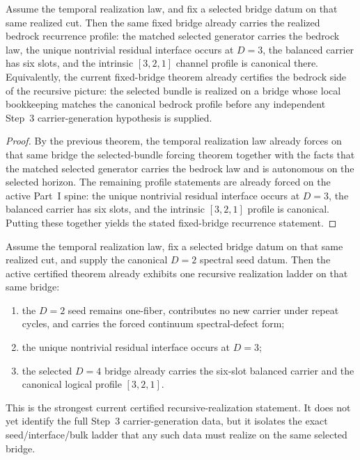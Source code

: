 \begin{theorem}
\label{thm:temporal-law-forces-the-realized-bedrock-recurrence-profile-on-a-fixed-bridge}
Assume the temporal realization law, and fix a selected bridge datum on that
same realized cut. Then the same fixed bridge already carries the realized
bedrock recurrence profile: the matched selected generator carries the bedrock
law, the unique nontrivial residual interface occurs at \(D=3\), the balanced
carrier has six slots, and the intrinsic \([3,2,1]\) channel profile is
canonical there. Equivalently, the current fixed-bridge theorem
already certifies the bedrock side of the recursive picture: the selected
bundle is realized on a bridge whose local bookkeeping matches the canonical
bedrock profile before any independent Step~3 carrier-generation hypothesis is
supplied.
\end{theorem}

\begin{proof}
By the previous theorem, the temporal realization law already forces on that
same bridge the selected-bundle forcing theorem together with the facts that
the matched selected generator carries the bedrock law and is autonomous on
the selected horizon. The remaining profile statements are already forced on
the active Part~I spine: the unique nontrivial residual interface occurs at
\(D=3\), the balanced carrier has six slots, and the intrinsic
\([3,2,1]\) profile is canonical. Putting these together yields the stated
fixed-bridge recurrence statement.
\end{proof}

\begin{theorem}[On a fixed selected bridge, recursive realization forms a \(D=2 \to D=3 \to D=4\) ladder]
\label{thm:temporal-law-and-d2-seed-form-the-recursive-realization-ladder-on-a-fixed-bridge}
Assume the temporal realization law, fix a selected bridge datum on that same
realized cut, and supply the canonical \(D=2\) spectral seed datum. Then the
active certified theorem already exhibits one recursive realization ladder on
that same bridge:
\begin{enumerate}[label=(\roman*), leftmargin=2em, itemsep=0.2em]
\item the \(D=2\) seed remains one-fiber, contributes no new carrier under
      repeat cycles, and carries the forced continuum spectral-defect form;
\item the unique nontrivial residual interface occurs at \(D=3\);
\item the selected \(D=4\) bridge already carries the six-slot balanced
      carrier and the canonical logical profile \([3,2,1]\).
\end{enumerate}
This is the strongest current certified recursive-realization statement. It does
not yet identify the full Step~3 carrier-generation data, but it isolates
the exact seed/interface/bulk ladder that any such data must realize on the
same selected bridge.
\end{theorem}

